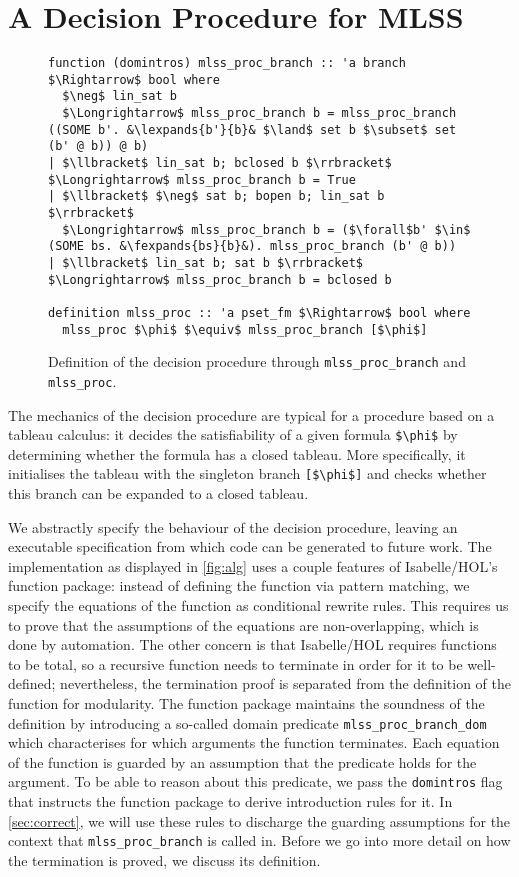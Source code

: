 \documentclass[sigplan,10pt,anonymous,review]{acmart}
\newcommand{\lefttrianglebar}{\mathrel{\tikz[baseline]{\draw (1ex, 0.75ex) -- (0, 1.25ex) -- (0, 0.25ex) -- cycle; \draw (0, 0.75ex) -- (1ex, 0.75ex);}}}
\newcommand{\lefttriangle}{\mathrel{\tikz[baseline]{\draw (1ex, 0.75ex) -- (0, 1.25ex) -- (0, 0.25ex) -- cycle;}}}
\newcommand{\lexpands}[2]{#1 $\lefttriangle$ #2}
\newcommand{\fexpands}[2]{#1 $\lefttrianglebar$ #2}
\begin{document}
\section{A Decision Procedure for MLSS}
\begin{figure*}
  \centering
\begin{lstlisting}
function (domintros) mlss_proc_branch :: 'a branch $\Rightarrow$ bool where
  $\neg$ lin_sat b
  $\Longrightarrow$ mlss_proc_branch b = mlss_proc_branch ((SOME b'. &\lexpands{b'}{b}& $\land$ set b $\subset$ set (b' @ b)) @ b)
| $\llbracket$ lin_sat b; bclosed b $\rrbracket$ $\Longrightarrow$ mlss_proc_branch b = True
| $\llbracket$ $\neg$ sat b; bopen b; lin_sat b $\rrbracket$
  $\Longrightarrow$ mlss_proc_branch b = ($\forall$b' $\in$ (SOME bs. &\fexpands{bs}{b}&). mlss_proc_branch (b' @ b))
| $\llbracket$ lin_sat b; sat b $\rrbracket$ $\Longrightarrow$ mlss_proc_branch b = bclosed b

definition mlss_proc :: 'a pset_fm $\Rightarrow$ bool where
  mlss_proc $\phi$ $\equiv$ mlss_proc_branch [$\phi$]
\end{lstlisting}
\caption{Definition of the decision procedure through \lstinline|mlss_proc_branch| and \lstinline|mlss_proc|.\label{fig:alg}}
\end{figure*}

\noindent The mechanics of the decision procedure are typical for a procedure based on a tableau calculus:
it decides the satisfiability of a given formula \lstinline!$\phi$! by determining whether the formula has a closed tableau.
More specifically, it initialises the tableau with the singleton branch \lstinline![$\phi$]! and checks whether this branch can be expanded to a closed tableau.

We abstractly specify the behaviour of the decision procedure, leaving an executable specification from which code can be generated to future work.
The implementation as displayed in \autoref{fig:alg} uses a couple features of Isabelle/HOL's function package:
instead of defining the function via pattern matching, we specify the equations of the function as conditional rewrite rules.
This requires us to prove that the assumptions of the equations are non-overlapping, which is done by automation.
The other concern is that Isabelle/HOL requires functions to be total, so a recursive function needs to terminate in order for it to be well-defined;
nevertheless, the termination proof is separated from the definition of the function for modularity.
The function package maintains the soundness of the definition by introducing a so-called domain predicate \lstinline!mlss_proc_branch_dom! which characterises for which arguments the function terminates.
Each equation of the function is guarded by an assumption that the predicate holds for the argument.
To be able to reason about this predicate, we pass the \lstinline!domintros! flag that instructs the function package to derive introduction rules for it.
In \autoref{sec:correct}, we will use these rules to discharge the guarding assumptions for the context that \lstinline!mlss_proc_branch! is called in.
Before we go into more detail on how the termination is proved, we discuss its definition.
\end{document}
